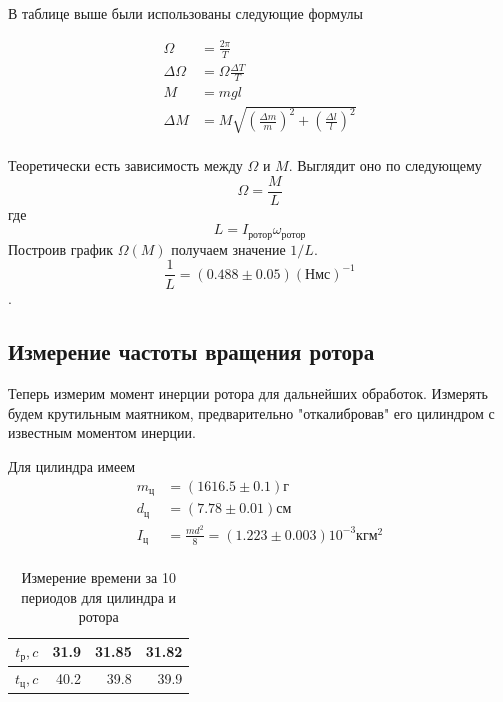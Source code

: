 \documentclass[a4paper, 12pt]{article}
\begin{document}
    \paragraph{}
    В таблице выше были использованы следующие формулы

    \begin{align*}
     \Omega &= \frac{2\pi}{T}\\
     \Delta \Omega &= \Omega \frac{\Delta T}{T}\\
     M &= mgl\\
     \Delta M &= M \sqrt{\left(\frac{\Delta m}{m}\right)^2 +
                        \left(\frac{\Delta l}{l}\right)^2}
    \end{align*}
    \paragraph{}
    Теоретически есть зависимость между $\Omega$ и $M$. Выглядит оно по следующему
    \[\Omega = \frac{M}{L}\]
    где
    \[L = I_{ротор}\omega_{ротор}\]
    Построив график $\Omega(M)$ получаем значение $1/L$.
    \[\frac{1}{L}=(0.488 \pm 0.05)(Нмс)^{-1}\].
    \newpage
    \subsection{Измерение частоты вращения ротора}
    Теперь измерим момент инерции ротора для дальнейших обработок. Измерять будем крутильным маятником, предварительно "откалибровав" его цилиндром с известным моментом инерции.

    Для цилиндра имеем
    \begin{align*}
     m_{ц} &= (1616.5 \pm 0.1)г\\
     d_{ц} &= (7.78 \pm 0.01)см\\
     I_{ц} &= \frac{md^2}{8} = (1.223 \pm 0.003) 10^{-3} кгм^2\\
    \end{align*}
    \begin{table}[h!]
        \begin{center}
        \begin{tabular}{|r||r||r||r|}
        \hline
        $t_р, c$ & 31.9 & 31.85 & 31.82\\\hline
        $t_ц, c$ & 40.2 & 39.8 & 39.9\\
        \hline
        \end{tabular}
         \caption{Измерение времени за 10 периодов для цилиндра и ротора}
        \end{center}

    \end{table}
    
\end{document}
